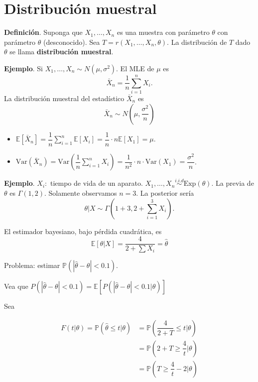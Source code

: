 \documentclass[
  12pt,
]{book}
\begin{document}
\hypertarget{distribuciuxf3n-muestral}{%
\chapter{Distribución muestral}\label{distribuciuxf3n-muestral}}

\textbf{Definición}. Suponga que \(X_1,\dots,X_n\) es una muestra con parámetro \(\theta\) con parámetro \(\theta\) (desconocido). Sea \(T=r(X_1,\dots,X_n,\theta)\). La distribución de \(T\) dado \(\theta\) se llama \textbf{distribución muestral}.

\textbf{Ejemplo}. Si \(X_1,\dots,X_n \sim N(\mu,\sigma^2)\). El MLE de \(\mu\) es \[\bar X_n = \dfrac 1n \sum_{i=1}^n X_i.\]
La distribución muestral del estadístico \(\bar X_n\) es
\[ \bar X_n \sim N\left(\mu, \dfrac{\sigma^2}n \right)\]

\begin{itemize}
\item
  \(\mathbb E[\bar X_n] = \dfrac 1n\displaystyle\sum_{i=1}^n\mathbb E[X_i] = \dfrac 1n\cdot n \mathbb E[X_1] = \mu\).
\item
  \(\text{Var}(\bar X_n) = \text{Var}\left(\dfrac 1n \displaystyle\sum_{i=1}^n X_i\right) = \dfrac{1}{n^2}\cdot n\cdot \text{Var}(X_1) = \dfrac{\sigma^2}n\).
\end{itemize}

\textbf{Ejemplo}. \(X_i:\) tiempo de vida de un aparato. \(X_1,\dots,X_n \stackrel{i.i.d}{\sim} \text{Exp}(\theta)\). La previa de \(\theta\) es \(\Gamma(1,2)\). Solamente observamos \(n=3\). La posterior sería
\[\theta|X \sim \Gamma(1+3,2+\sum_{i=1}^3 X_i). \]

El estimador bayesiano, bajo pérdida cuadrática, es
\[\mathbb E[\theta|X] =  \dfrac 4{2+\sum X_i} = \hat\theta\]

Problema: estimar \(\mathbb P(|\hat\theta-\theta|<0.1)\).

Vea que \(P(|\hat\theta-\theta|<0.1) = \mathbb E[P(|\hat\theta-\theta|<0.1|\theta)]\)

Sea

\begin{align*}
F(t|\theta) = \mathbb P(\hat\theta\leq t|\theta)&= \mathbb P\left( \dfrac 4{2+T}\leq t\bigg|\theta\right) \\
& = \mathbb P\left( 2+T \geq \dfrac 4t\bigg|\theta\right)\\
& = \mathbb P\left( T \geq \dfrac 4t-2\bigg|\theta\right)\\
\end{align*}
\end{document}
